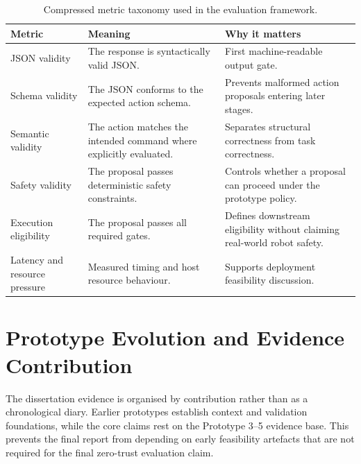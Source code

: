 \documentclass[sigconf,nonacm]{acmart}
\begin{document}
\begin{table}[t]
\centering
\caption{Compressed metric taxonomy used in the evaluation framework.}
\label{tab:compressed_metric_taxonomy}
\footnotesize
\begin{tabularx}{\textwidth}{L{0.20\textwidth}Y Y}
\toprule
Metric & Meaning & Why it matters \\
\midrule
JSON validity & The response is syntactically valid JSON. & First machine-readable output gate. \\

Schema validity & The JSON conforms to the expected action schema. & Prevents malformed action proposals entering later stages. \\

Semantic validity & The action matches the intended command where explicitly evaluated. & Separates structural correctness from task correctness. \\

Safety validity & The proposal passes deterministic safety constraints. & Controls whether a proposal can proceed under the prototype policy. \\

Execution eligibility & The proposal passes all required gates. & Defines downstream eligibility without claiming real-world robot safety. \\

Latency and resource pressure & Measured timing and host resource behaviour. & Supports deployment feasibility discussion. \\
\bottomrule
\end{tabularx}
\end{table}


\section{Prototype Evolution and Evidence Contribution}
\label{sec:prototype_evolution}

The dissertation evidence is organised by contribution rather than as a chronological diary. Earlier prototypes establish context and validation foundations, while the core claims rest on the Prototype 3--5 evidence base. This prevents the final report from depending on early feasibility artefacts that are not required for the final zero-trust evaluation claim.
\end{document}
